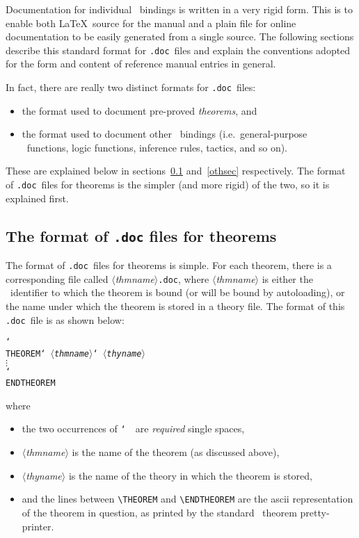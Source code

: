 \documentclass[12pt]{article}
\def\doc{{\tt .doc}}
\def\latex{{\LaTeX}}
\def\vsp{{\tt\char`\ }}
\def\bk{{\tt\char`\\ }}
\def\meta#1{\(\langle\){\it #1}\(\rangle\)}
\begin{document}
Documentation for individual \ML\ bindings is written in a very rigid form.
This is to enable both \latex\ source for the manual and a plain file for
online documentation to be easily generated from a single source. The following
sections describe this standard format for \doc\ files and explain the
conventions adopted for the form and content of reference manual entries in
general.

In fact, there are really two distinct formats for \doc\ files:

\begin{itemize}
\item the format used to document pre-proved {\it theorems\/}, and
\item the format used to document other \ML\ bindings (i.e.\ general-purpose
\ML\ functions, logic functions, inference rules, tactics, and so on).
\end{itemize}

\noindent These are explained below in sections~\ref{thsec} and~\ref{othsec}
respectively.  The format of \doc\ files for theorems is the simpler (and more
rigid) of the two, so it is explained first.

\subsection{The format of {\tt .doc} files for theorems}\label{thsec}

The format of \doc\ files for theorems is simple.  For each theorem, there is
a corresponding file called \meta{thmname}\doc, where \meta{thmname} is either
the \ML\ identifier to which the theorem is bound (or will be bound by
autoloading), or the name under which the theorem is stored in a theory file.
The format of this \doc\ file is as shown below:

\smallskip

\begin{boxed}\begin{alltt}
\bk{THEOREM}\vsp\meta{thmname}\vsp\meta{thyname}
\(\vdots\)
\bk{ENDTHEOREM}
\end{alltt}\end{boxed}

\smallskip

\noindent where

\begin{itemize}

\item the two occurrences of \vsp\ are {\it required\/} single spaces,

\item \meta{thmname} is the name of the theorem (as discussed above),

\item \meta{thyname} is the name of the theory in which the theorem is stored,

\item and the lines between {\small\verb!\THEOREM!} and
{\small\verb!\ENDTHEOREM!} are the ascii representation of the theorem in
question, as printed by the standard \HOL\ theorem pretty-printer.

\end{itemize}
\end{document}
